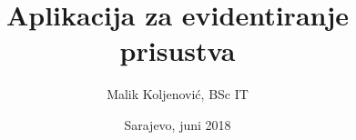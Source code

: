 \documentclass[a4paper,11pt,titlepage]{report}
\title{Aplikacija za evidentiranje prisustva}
\author{Malik Koljenović, BSc IT}
\date{Sarajevo, juni 2018}
\begin{document}
	
	
	\tableofcontents
	\listoffigures
	\listoftables
    \glsaddall
	\printglossaries
	
	
	
	
	
	
	
	\begin{appendices}
		
		
		
	\end{appendices}
	
	
	
\end{document}
